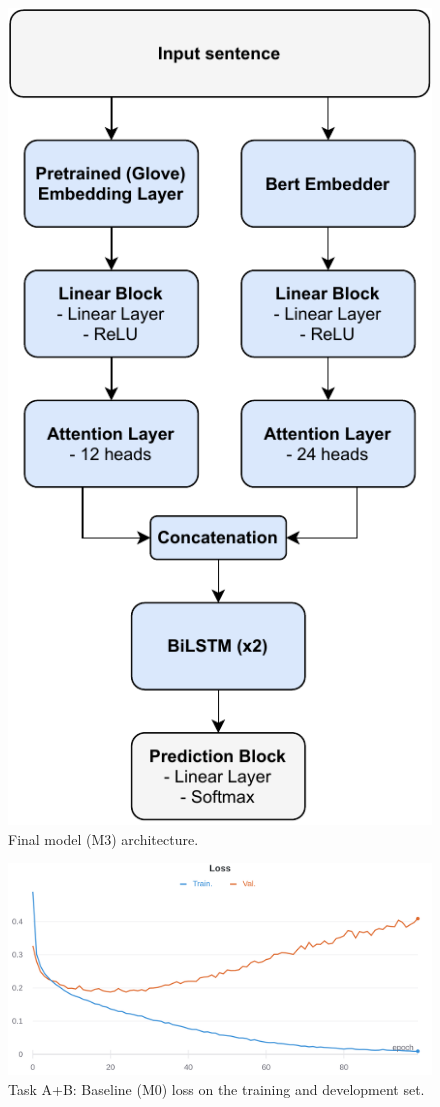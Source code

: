 \documentclass[11pt,a4paper]{article}
\begin{document}
	
	\begin{figure}[H]
		\centering
		\includegraphics[width=0.9\columnwidth]{M3_diagram.pdf}
		\caption{Final model (M3) architecture.}
		\label{fig:M3_architecture}
	\end{figure}
	
	

	\begin{figure}[H]
		\centering
		\includegraphics[width=1\columnwidth]{M0_ab_loss.png}
		\caption{Task A+B: Baseline (M0) loss on the training and development set.}
		\label{fig:M0_loss}
	\end{figure}
\end{document}
